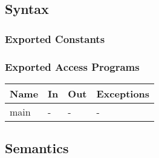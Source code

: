 \documentclass[12pt, titlepage]{article}
\begin{document}
\subsection{Syntax}

\subsubsection{Exported Constants}

\subsubsection{Exported Access Programs}

\begin{center}
\begin{tabular}{p{2cm} p{4cm} p{4cm} p{2cm}}
\hline
\textbf{Name} & \textbf{In} & \textbf{Out} & \textbf{Exceptions} \\
\hline
main & - & - & - \\
\hline
\end{tabular}
\end{center}

\subsection{Semantics}
\end{document}
